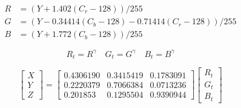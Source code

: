 \begin{align}
R& = (Y + 1.402 (C_r - 128) \label{e:ycbcr-rgb-first}) / 255 \\
G& = (Y - 0.34414 (C_b - 128) - 0.71414 (C_r - 128)) / 255 \\
B& = (Y + 1.772 (C_b - 128)) / 255\label{e:ycbcr-rgb-last}
\end{align}

\begin{equation}
R_t = R^\gamma \quad G_t = G^\gamma \quad B_t = B^\gamma
\label{e:secam-rgb-xyz-first}
\end{equation}

\begin{equation}
\begin{bmatrix}
  X \\ Y \\ Z
\end{bmatrix}
=
\begin{bmatrix}
 0.4306190 & 0.3415419 & 0.1783091 \\
 0.2220379 & 0.7066384 & 0.0713236 \\
 0.201853  &  0.1295504 & 0.9390944
\end{bmatrix}
\begin{bmatrix}
  R_t \\ G_t \\ B_t
\end{bmatrix}
\label{e:secam-rgb-xyz-last}
\end{equation}